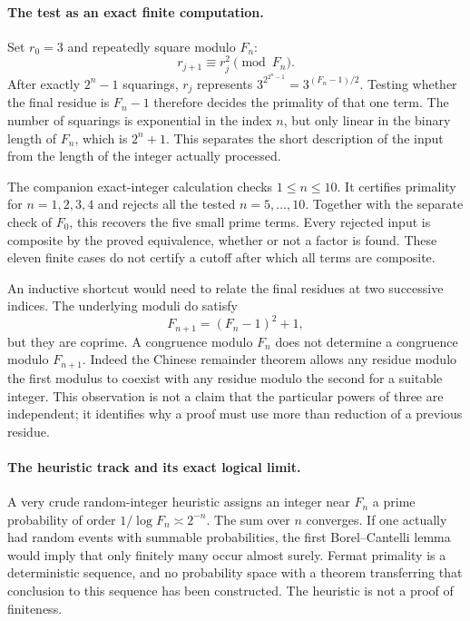 \documentclass[11pt]{article}
\begin{document}
\paragraph{The test as an exact finite computation.}
Set $r_0=3$ and repeatedly square modulo $F_n$:
\[
                       r_{j+1}\equiv r_j^2\pmod{F_n}.
\]
After exactly $2^n-1$ squarings, $r_j$ represents
$3^{2^{2^n-1}}=3^{(F_n-1)/2}$. Testing whether the final residue is
$F_n-1$ therefore decides the primality of that one term. The number
of squarings is exponential in the index $n$, but only linear in the
binary length of $F_n$, which is $2^n+1$. This separates the short
description of the input from the length of the integer actually processed.

The companion exact-integer calculation checks $1\leq n\leq10$.
It certifies primality for $n=1,2,3,4$ and rejects all the tested
$n=5,\ldots,10$. Together with the separate check of $F_0$, this
recovers the five small prime terms. Every rejected input is composite
by the proved equivalence, whether or not a factor is found. These
eleven finite cases do not certify a cutoff after which all terms are
composite.

An inductive shortcut would need to relate the final residues at two
successive indices. The underlying moduli do satisfy
\begin{equation}\label{a476:recurrence}
                     F_{n+1}=(F_n-1)^2+1,
\end{equation}
but they are coprime. A congruence modulo $F_n$ does not determine a
congruence modulo $F_{n+1}$. Indeed the Chinese remainder theorem
allows any residue modulo the first modulus to coexist with any residue
modulo the second for a suitable integer. This observation is not a
claim that the particular powers of three are independent; it identifies
why a proof must use more than reduction of a previous residue.

\paragraph{The heuristic track and its exact logical limit.}
A very crude random-integer heuristic assigns an integer near $F_n$
a prime probability of order $1/\log F_n\asymp2^{-n}$. The sum over
$n$ converges. If one actually had random events with summable
probabilities, the first Borel--Cantelli lemma would imply that only
finitely many occur almost surely. Fermat primality is a deterministic
sequence, and no probability space with a theorem transferring that
conclusion to this sequence has been constructed. The heuristic is
not a proof of finiteness.
\end{document}
